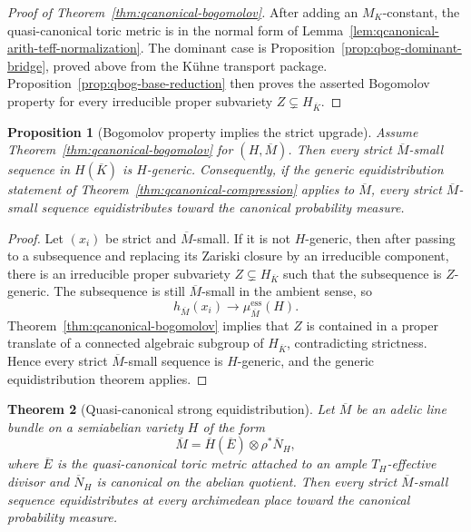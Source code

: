 \documentclass[10pt,a4paper]{amsart}
\theoremstyle{plain}
\newtheorem{theorem}{Theorem}
\newtheorem{proposition}[theorem]{Proposition}
\theoremstyle{plain}
\numberwithin{equation}{section}
\providecommand{\bN}{\overline{N}}
\providecommand{\bE}{\overline{E}}
\providecommand{\bM}{\overline{M}}
\providecommand{\muess}{\mu^{\mathrm{ess}}}
\begin{document}
\begin{proof}[Proof of Theorem~\ref{thm:qcanonical-bogomolov}]
	After adding an \(M_K\)-constant, the quasi-canonical toric metric is in the
	normal form of Lemma~\ref{lem:qcanonical-arith-teff-normalization}.  The
	dominant case is Proposition~\ref{prop:qbog-dominant-bridge}, proved above
	from the K\"uhne transport package.  Proposition~\ref{prop:qbog-base-reduction}
	then proves the asserted Bogomolov property for every irreducible proper
	subvariety \(Z\subsetneq H_{\overline K}\).
\end{proof}

\begin{proposition}[Bogomolov property implies the strict upgrade]
	\label{prop:qbog-to-qsec}
	Assume Theorem~\ref{thm:qcanonical-bogomolov} for \((H,\bM)\).  Then every strict
	\(\bM\)-small sequence in \(H(\overline K)\) is \(H\)-generic.
	Consequently, if the generic equidistribution statement of
	Theorem~\ref{thm:qcanonical-compression} applies to \(\bM\), every strict
	\(\bM\)-small sequence equidistributes toward the canonical probability
	measure.
\end{proposition}

\begin{proof}
	Let \((x_i)\) be strict and \(\bM\)-small.  If it is not \(H\)-generic, then
	after passing to a subsequence and replacing its Zariski closure by an
	irreducible component, there is an irreducible proper subvariety
	\(Z\subsetneq H_{\overline K}\) such that the subsequence is \(Z\)-generic.
	The subsequence is still \(\bM\)-small in the ambient sense, so
	\[
	h_{\bM}(x_i)\longrightarrow \muess_{\bM}(H).
	\]
	Theorem~\ref{thm:qcanonical-bogomolov} implies that \(Z\) is contained in a proper translate
	of a connected algebraic subgroup of \(H_{\overline K}\), contradicting
	strictness.  Hence every strict \(\bM\)-small sequence is \(H\)-generic, and
	the generic equidistribution theorem applies.
\end{proof}

\begin{theorem}[Quasi-canonical strong equidistribution]
	\label{thm:qcanonical-strong-equidistribution}
	\label{input:qsec}
	Let \(\bM\) be an adelic line bundle on a semiabelian variety \(H\) of the form
	\[
	\bM=\overline H(\bE)\otimes \rho^*\bN_H,
	\]
	where \(\bE\) is the quasi-canonical toric metric attached to an ample
	\(T_H\)-effective divisor and \(\bN_H\) is canonical on the abelian quotient.
	Then every strict \(\bM\)-small sequence equidistributes at every archimedean
	place toward the canonical probability measure.
\end{theorem}
\end{document}
